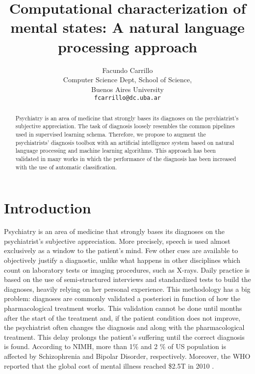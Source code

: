\documentclass[11pt,a4paper]{article}
\title{Computational characterization of mental states:  A natural language processing approach}
\author{Facundo Carrillo \\
  Computer Science Dept, School of Science, \\
  Buenos Aires University \\
  {\tt fcarrillo@dc.uba.ar} }
\date{}
\begin{document}
\maketitle
\begin{abstract}
 Psychiatry is an area of medicine that strongly bases its diagnoses on the psychiatrist’s subjective appreciation. The task of diagnosis loosely resembles the common pipelines used in supervised learning schema. Therefore, we propose to augment the psychiatrists’ diagnosis toolbox with an artificial intelligence system based on natural language processing and machine learning algorithms. This approach has been validated in many works in which the performance of the  diagnosis has been increased with the use of automatic classification. 
 
 \end{abstract}
 

\section{Introduction}

Psychiatry is an area of medicine that strongly bases its diagnoses on the psychiatrist’s subjective appreciation. More precisely, speech is used almost exclusively as a window to the patient’s mind. Few other cues are available to objectively justify a diagnostic, unlike what happens in other disciplines which count on laboratory tests or imaging procedures, such as X-rays. Daily practice is based on the use of semi-structured interviews and standardized tests to build the diagnoses, heavily relying on her personal experience. This methodology has a big problem: diagnoses are commonly validated a posteriori in function of how the pharmacological treatment works. This validation cannot be done until months after the start of the treatment and, if the patient condition does not improve, the psychiatrist often changes the diagnosis and along with the pharmacological treatment. This delay prolongs the patient's suffering until the correct diagnosis is found. According to NIMH, more than 1\% and 2 \% of US population is affected by Schizophrenia and Bipolar Disorder, respectively. Moreover, the WHO reported that the global cost of mental illness reached \$2.5T in 2010 \cite{mathers2008global} .
\end{document}
